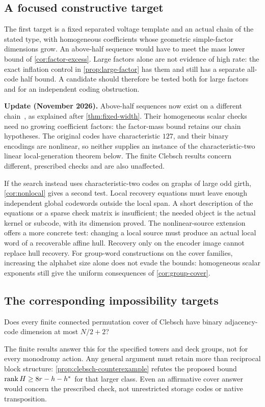 \subsection{A focused constructive target}
The first target is a fixed separated voltage template and an actual
chain of the stated type, with homogeneous coefficients whose
geometric simple-factor dimensions grow. An above-half sequence
would have to meet the mass lower bound of \cref{cor:factor-excess}.
Large factors alone are not evidence of high rate: the exact
inflation control in \cref{prop:large-factor} has them and still
has a separate all-code half bound. A candidate should therefore be
tested both for large factors and for an independent coding obstruction.

\textbf{Update (November 2026).} Above-half sequences now exist on a
different chain~\cite{StorageCodes2026}, as explained after
\cref{thm:fixed-width}. Their homogeneous scalar checks need no growing
coefficient factors: the factor-mass bound retains our chain hypotheses.
The original codes have characteristic $127$, and their binary encodings
are nonlinear, so neither supplies an instance of the characteristic-two
linear local-generation theorem below. The finite Clebsch results concern
different, prescribed checks and are also unaffected.

If the search instead uses characteristic-two codes on graphs of
large odd girth, \cref{cor:nonlocal} gives a second test. Local
recovery equations must leave enough independent global codewords
outside the local span. A short description of the equations or a
sparse check matrix is insufficient; the needed object is the
actual kernel or subcode, with its dimension proved.
The nonlinear-source extension offers a more concrete test: changing a
local source must produce an actual local word of a recoverable affine
hull. Recovery only on the encoder image cannot replace hull recovery.
For group-word constructions on the cover families, increasing the
alphabet size alone does not evade the bounds: homogeneous scalar
exponents still give the uniform consequences of \cref{cor:group-cover}.

\subsection{The corresponding impossibility targets}
\begin{question}\label{prob:clebsch-all}
Does every finite connected permutation cover of Clebsch have binary
adjacency-code dimension at most $N/2+2$?
\end{question}
The finite results answer this for the specified towers and deck groups,
not for every monodromy action. Any general argument must retain more
than reciprocal block structure: \cref{prop:clebsch-counterexample}
refutes the proposed bound $\operatorname{rank} H\ge8r-h-h^*$ for that larger class.
Even an affirmative cover answer would concern the prescribed check,
not unrestricted storage codes or native transposition.

